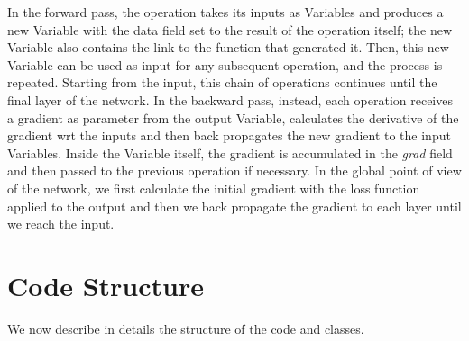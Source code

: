\documentclass[10pt,conference,compsocconf]{IEEEtran}
\begin{document}
	In the forward pass, the operation takes its inputs as Variables and produces a new Variable with the data field set to the result of the operation itself; the new Variable also contains the link to the function that generated it. Then, this new Variable can be used as input for any subsequent operation, and the process is repeated.  Starting from the input, this chain of operations continues until the final layer of the network. 
	In the backward pass, instead, each operation receives a gradient as parameter from the output Variable, calculates the derivative of the gradient wrt the inputs and then back propagates the new gradient to the input Variables. Inside the Variable itself, the gradient is accumulated in the \textit{grad} field and then passed to the previous operation if necessary. In the global point of view of the network, we first calculate the initial gradient with the loss function applied to the output and then we back propagate the gradient to each layer until we reach the input.
        
        
\section{Code Structure}
We now describe in details the structure of the code and classes.
\end{document}

